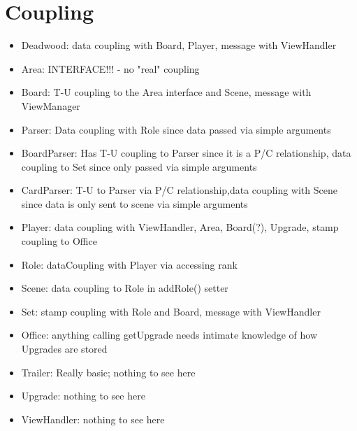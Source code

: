 \documentclass[letterpaper, twoside]{report}
\begin{document}
\chapter{Coupling}
\begin{itemize}
    \item Deadwood: data coupling with Board, Player, message with ViewHandler
    \item Area: INTERFACE!!! - no "real" coupling
    \item Board: T-U coupling to the Area interface and Scene, message with ViewManager
    \item Parser: Data coupling with Role since data passed via simple arguments
    \item BoardParser: Has T-U coupling to Parser since it is a P/C relationship, data coupling to Set since only passed via simple arguments
    \item CardParser: T-U to Parser via P/C relationship,data coupling with Scene since data is only sent to scene via simple arguments
    \item Player: data coupling with ViewHandler, Area, Board(?), Upgrade, stamp coupling to Office
    \item Role: dataCoupling with Player via accessing rank
    \item Scene: data coupling to Role in addRole() setter
    \item Set: stamp coupling with Role and Board, message with ViewHandler
    \item Office: anything calling getUpgrade needs intimate knowledge of how Upgrades are stored
    \item Trailer: Really basic; nothing to see here
    \item Upgrade: nothing to see here
    \item ViewHandler: nothing to see here
\end{itemize}
\end{document}
